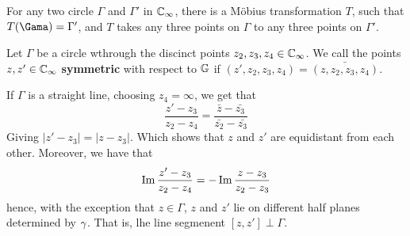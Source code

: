 \begin{lemma}\label{3.3.9}
    For any two circle $\Gamma$ and  $\Gamma'$ in $\mathbb{C}_\infty$, there is a
    M\"obius transformation  $T$, such that  $T(\Gama)=\Gamma'$, and $T$ takes
    any three points on  $\Gamma$ to any three points on  $\Gamma'$.
\end{lemma}

\begin{definition}
    Let $\Gamma$ be a circle wthrough the discinct points $z_2,z_3,z_4 \in
    \mathbb{C}_\infty$. We call the points $z,z' \in \mathbb{C}_\infty$  \textbf{symmetric} with
    respect to $\mathbb{G}$ if  $(z',z_2,z_3,z_4)=\bar{(z,z_2,z_3,z_4)}$.
\end{definition}

\begin{example}\label{example_3.9}
    If $\Gamma$ is a straight line, choosing  $z_4=\infty$, we get that
    \begin{equation*}
        \frac{z'-z_3}{z_2-z_4}=\frac{\bar{z}-\bar{z_3}}{\bar{z_2}-\bar{z_3}}
    \end{equation*}
    Giving $|z'-z_3|=|z-z_3|$. Which shows that $z$ and  $z'$ are equidistant
    from each other. Moreover, we have that
    \begin{equation*}
        \operatorname{Im}{\frac{z'-z_3}{z_2-z_4}}=-\operatorname{Im}{\frac{z-z_3}{z_2-z_3}}
    \end{equation*}
    hence, with the exception that $z \in \Gamma$, $z$ and $z'$ lie on different
    half planes determined by  $\gamma$. That is, lhe line segmenent $[z,z'] \perp
    \Gamma$.


\end{example}
